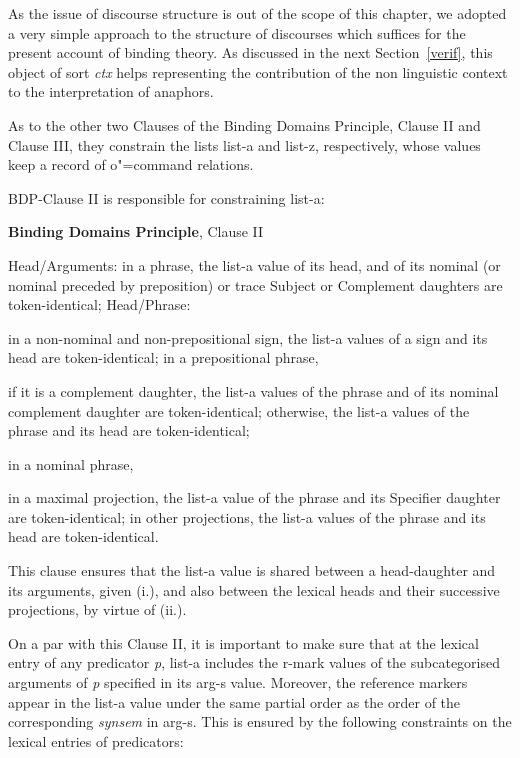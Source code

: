 \documentclass[output=paper
,modfonts
,nonflat]{langsci/langscibook}
\begin{document}
As the issue of discourse structure is out
of the scope of this chapter, we adopted a very simple approach to the 
structure of discourses
which suffices for the present account of binding theory.
As discussed in the next \mbox{Section \ref{verif},} this object
of sort \emph{ctx} helps representing the contribution of the non linguistic context to the 
interpretation of anaphors.

 
As to the other two Clauses of the Binding Domains Principle, 
Clause II and Clause III,
they constrain the lists {\sc list-a} and {\sc list-z}, respectively,
whose values keep a record of o"=command relations.

BDP-Clause II is responsible for constraining {\sc list-a}:

\begin{exe}
\ex
\textbf{Binding Domains Principle}, Clause II
\begin{xlisti}
\ex	Head/Arguments: in a phrase, the {\sc list-a} value of its head, and of its nominal (or
nominal preceded by preposition) or trace Subject or Complement daughters are
token-identical;
\ex Head/Phrase:
\begin{xlisti}
\ex	in a non-nominal and non-prepositional sign, the {\sc list-a} values of a sign and its
head are token-identical;
\ex	in a prepositional phrase,
\begin{itemize}
\ex if it is a complement daughter, the {\sc list-a} values of the phrase and of its nominal
complement daughter are token-identical;
\ex otherwise, the {\sc list-a} values of the phrase and its head are token-identical;
\end{itemize}
\ex	in a nominal phrase,
\begin{itemize} 
\ex in a maximal projection, the {\sc list-a} value of the phrase and its Specifier daughter
are token-identical;
\ex in other projections, the {\sc list-a} values of the phrase and its head are
token-identical.
\end{itemize}
\end{xlisti}
\end{xlisti}
\end{exe}

This clause ensures that the {\sc list-a} value is shared between a head-daughter and its arguments, given (i.),
and also between the lexical heads and their successive projections, by virtue of (ii.).

On a par with this Clause II, it is important to make sure
that at the lexical entry of any predicator {\it p}, {\sc list-a} includes 
the {\sc r-mark}
values of the  subcategorised arguments of {\it p} specified in its
{\sc arg-s} value. Moreover, the reference markers appear in the {\sc list-a} 
value under the same partial order as the order of the corresponding \emph{synsem} 
in {\sc arg-s}. This is ensured by the following constraints on the lexical 
entries of predicators:
\end{document}
